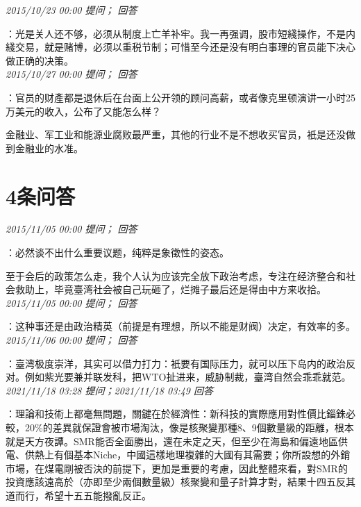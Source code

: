 \documentclass[twocolumn]{ctexart}
\begin{document}
\textit{\hfill\noindent\small 2015/10/23 00:00 提问； 回答}

：光是关人还不够，必须从制度上亡羊补牢。我一再强调，股市短綫操作，不是内綫交易，就是赌博，必须以重税节制；可惜至今还是没有明白事理的官员能下决心做正确的决策。\\

\textit{\hfill\noindent\small 2015/10/27 00:00 提问； 回答}

：官员的财產都是退休后在台面上公开领的顾问高薪，或者像克里顿演讲一小时25万美元的收入，公布了又能怎么样？

金融业、军工业和能源业腐败最严重，其他的行业不是不想收买官员，衹是还没做到金融业的水准。\\

\section{4条问答}

\textit{\hfill\noindent\small 2015/11/05 00:00 提问； 回答}

：必然谈不出什么重要议题，纯粹是象徵性的姿态。

至于会后的政策怎么走，我个人认为应该完全放下政治考虑，专注在经济整合和社会救助上，毕竟臺湾社会被自己玩砸了，烂摊子最后还是得由中方来收拾。\\

\textit{\hfill\noindent\small 2015/11/05 00:00 提问； 回答}

：这种事还是由政治精英（前提是有理想，所以不能是财阀）决定，有效率的多。\\

\textit{\hfill\noindent\small 2015/11/06 00:00 提问； 回答}

：臺湾极度崇洋，其实可以借力打力：衹要有国际压力，就可以压下岛内的政治反对。例如紫光要兼并联发科，把WTO扯进来，威胁制裁，臺湾自然会乖乖就范。\\

\textit{\hfill\noindent\small 2021/11/18 03:28 提问；2021/11/18 03:49 回答}

：理論和技術上都毫無問題，關鍵在於經濟性：新科技的實際應用對性價比錙銖必較，20\%的差異就保證會被市場淘汰，像是核聚變那種8、9個數量級的距離，根本就是天方夜譚。SMR能否全面勝出，還在未定之天，但至少在海島和偏遠地區供電、供熱上有個基本Niche，中國這樣地理複雜的大國有其需要；你所設想的外銷市場，在煤電剛被否決的前提下，更加是重要的考慮，因此整體來看，對SMR的投資應該遠高於（亦即至少兩個數量級）核聚變和量子計算才對，結果十四五反其道而行，希望十五五能撥亂反正。
\\
\end{document}
